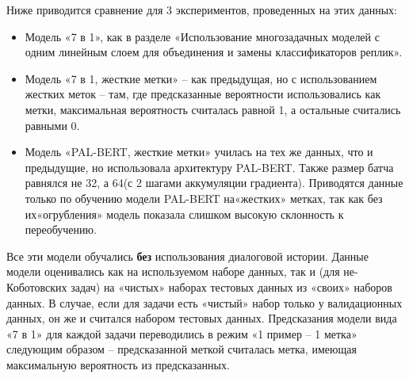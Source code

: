 Ниже приводится сравнение для 3 экспериментов, проведенных на этих данных:
\begin{itemize}
\item Модель «7 в 1», как в разделе «Использование многозадачных моделей с одним линейным слоем для объединения и замены классификаторов реплик».
\item Модель «7 в 1, жесткие метки» -- как предыдущая, но с использованием жестких меток -- там, где предсказанные вероятности использовались как метки, максимальная вероятность считалась равной 1, а остальные считались равными 0.
\item Модель «PAL-BERT, жесткие метки» училась на тех же данных, что и предыдущие, но использовала архитектуру PAL-BERT. Также размер батча равнялся не 32, а 64(с 2 шагами аккумуляции градиента). Приводятся данные только по обучению модели PAL-BERT на«жестких» метках, так как без их«огрубления» модель показала слишком высокую склонность к переобучению.
\end{itemize}
Все эти модели обучались \textbf{без} использования диалоговой истории.
Данные модели оценивались как на используемом наборе данных, так и (для не-Коботовских задач) на «чистых» наборах тестовых данных из «своих» наборов данных. В случае, если для задачи есть «чистый» набор только у валидационных данных, он же и считался набором тестовых данных.
Предсказания модели вида «7 в 1» для каждой задачи переводились в режим «1 пример -- 1 метка» следующим образом -- предсказанной меткой считалась метка, имеющая максимальную вероятность из предсказанных.

